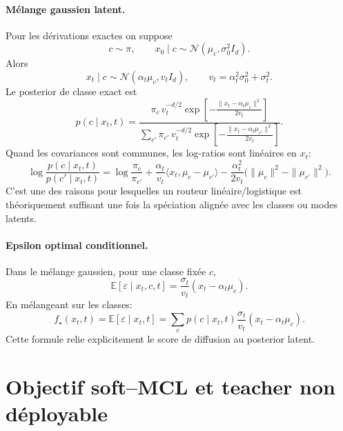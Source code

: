 \documentclass[11pt,a4paper]{article}
\newcommand{\E}{\mathbb{E}}
\newcommand{\1}{\mathbf{1}}
\newcommand{\eps}{\varepsilon}
\newcommand{\xt}{x_t}
\newcommand{\xzero}{x_0}
\begin{document}
\paragraph{Mélange gaussien latent.}
Pour les dérivations exactes on suppose
\begin{equation}
 c\sim \pi,
\qquad
 \xzero\mid c\sim\mathcal N(\mu_c,\sigma_0^2 I_d).
\label{eq:gmm}
\end{equation}
Alors
\begin{equation}
 \xt\mid c\sim \mathcal N(\alpha_t\mu_c,v_t I_d),
 \qquad
 v_t=\alpha_t^2\sigma_0^2+\sigma_t^2.
\label{eq:xt_given_c}
\end{equation}
Le posterior de classe exact est
\begin{equation}
 p(c\mid \xt,t)=\frac{\pi_c\,v_t^{-d/2}\exp\left[-\frac{\|\xt-\alpha_t\mu_c\|^2}{2v_t}\right]}
 {\sum_{c'}\pi_{c'}\,v_t^{-d/2}\exp\left[-\frac{\|\xt-\alpha_t\mu_{c'}\|^2}{2v_t}\right]}.
\label{eq:gmm_posterior}
\end{equation}
Quand les covariances sont communes, les log-ratios sont linéaires en $\xt$:
\begin{equation}
\log\frac{p(c\mid\xt,t)}{p(c'\mid\xt,t)}
=\log\frac{\pi_c}{\pi_{c'}}+\frac{\alpha_t}{v_t}\langle \xt,\mu_c-\mu_{c'}\rangle
-\frac{\alpha_t^2}{2v_t}\bigl(\|\mu_c\|^2-\|\mu_{c'}\|^2\bigr).
\label{eq:linear_posterior}
\end{equation}
C'est une des raisons pour lesquelles un routeur linéaire/logistique est théoriquement suffisant une fois la spéciation alignée avec les classes ou modes latents.

\paragraph{Epsilon optimal conditionnel.}
Dans le mélange gaussien, pour une classe fixée $c$,
\begin{equation}
 \E[\eps\mid \xt,c,t]
 =\frac{\sigma_t}{v_t}\left(\xt-\alpha_t\mu_c\right).
\label{eq:eps_cond_c}
\end{equation}
En mélangeant sur les classes:
\begin{equation}
 f_\star(\xt,t)=\E[\eps\mid \xt,t]
 =\sum_c p(c\mid\xt,t)\frac{\sigma_t}{v_t}(\xt-\alpha_t\mu_c).
\label{eq:eps_bayes}
\end{equation}
Cette formule relie explicitement le score de diffusion au posterior latent.

\section{Objectif soft--MCL et teacher non déployable}
\end{document}
